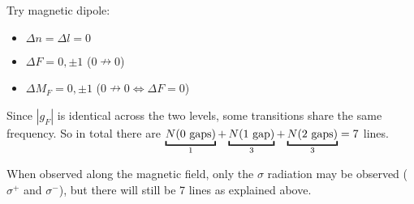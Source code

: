 \begin{parts}
	Try magnetic dipole:
	\begin{itemize}
		\item $\Delta n = \Delta l = 0$
		\item $\Delta F = 0, \pm 1$ ($0 \nrightarrow 0$)
		\item $\Delta M_F = 0, \pm 1$ ($0 \nrightarrow 0 \iff \Delta F = 0$)
	\end{itemize}
	
	Since $|g_F|$ is identical across the two levels, some transitions share the same frequency.
	So in total there are $\underbracket{N(\textnormal{0 gaps})}_{1} + \underbracket{N(\textnormal{1 gap})}_{3} + \underbracket{N(\textnormal{2 gaps})}_{3} = 7$ lines.
	
	When observed along the magnetic field, only the $\sigma$ radiation may be observed ($\sigma^+$ and $\sigma^-$), but there will still be 7 lines as explained above.
\end{parts}